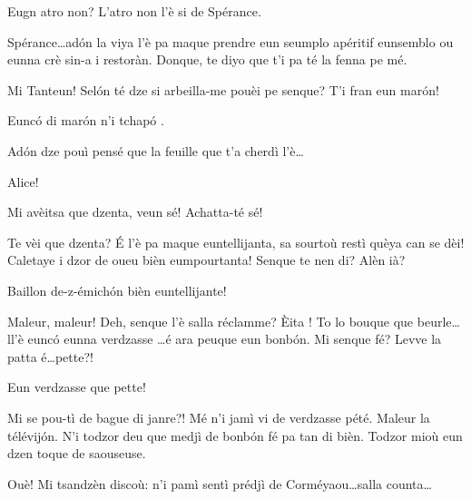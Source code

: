 \begin{drama}
\Tanteunspeaks Eugn atro non? L'atro non l'è si de Spérance.


\Tanteunspeaks Spérance\ldots ad\'on la viya l'è pa maque prendre eun seumplo apéritif eunsemblo ou eunna crè sin-a i restoràn. Donque, te diyo que t'i pa té la fenna pe mé.

\Sperancespeaks Mi Tanteun! Sel\'on té dze si arbeilla-me pouèi pe senque? T'i fran eun mar\'on! 


\Tanteunspeaks{} Eunc\'o di mar\'on n'i tchap\'o .

\Mariespeaks Ad\'on dze pouì pensé que la feuille que t'a cherdì l'è\ldots

\Tanteunspeaks{} Alice!


\Tanteunspeaks Mi avèitsa que dzenta, veun sé! Achatta-té sé!


\Tanteunspeaks{} Te vèi que dzenta? \'E l'è pa maque euntellijanta, sa sourtoù restì quèya can se dèi! Caletaye i dzor de oueu bièn eumpourtanta! Senque te nen di? Alèn ià?





\Vioujspeaks Baillon de-z-émich\'on bièn euntellijante!

\Vioupspeaks Maleur, maleur! Deh, senque l'è salla réclamme? \`Eita ! To lo bouque que beurle\ldots ll'è eunc\'o eunna verdzasse \ldots é ara peuque eun bonb\'on. Mi senque fé? Levve la patta é\ldots pette?! 


\Vioujspeaks Eun verdzasse que pette!

\Vioupspeaks Mi se pou-tì de bague di janre?! Mé n'i jamì vi de verdzasse pété. Maleur la télévij\'on. N'i todzor deu que medjì de bonb\'on fé pa tan di bièn. Todzor mioù eun dzen toque de saouseuse.

\Vioujspeaks Ouè! Mi tsandzèn discoù:  n'i pamì sentì prédjì de Corméyaou\ldots salla counta\ldots


\end{drama}
